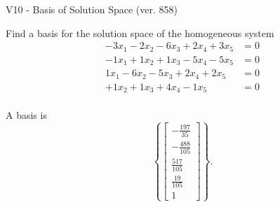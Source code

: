 \begin{exercise}
  \begin{exerciseTitle}V10 - Basis of Solution Space (ver. 858)\end{exerciseTitle}
  \begin{exerciseStatement}
    Find a basis for the solution space of the homogeneous system 
\begin{align*}
 -3 x_ 1 -2 x_ 2 -6 x_ 3 + 2 x_ 4 + 3 x_ 5 &= 0  \\ 
  -1 x_ 1 + 1 x_ 2 + 1 x_ 3 -5 x_ 4 -5 x_ 5 &= 0  \\ 
  1 x_ 1 -6 x_ 2 -5 x_ 3 + 2 x_ 4 + 2 x_ 5 &= 0  \\ 
  + 1 x_ 2 + 1 x_ 3 + 4 x_ 4 -1 x_ 5 &= 0  \\ 
 \end{align*}


 
  \end{exerciseStatement}

  \begin{exerciseAnswer}
   A basis is   
\[\left\{\left[\begin{array}{c}
-\frac{197}{35} \\
-\frac{488}{105} \\
\frac{517}{105} \\
\frac{19}{105} \\
1
\end{array}\right]\right\}.\]

  


  \end{exerciseAnswer}
\end{exercise}